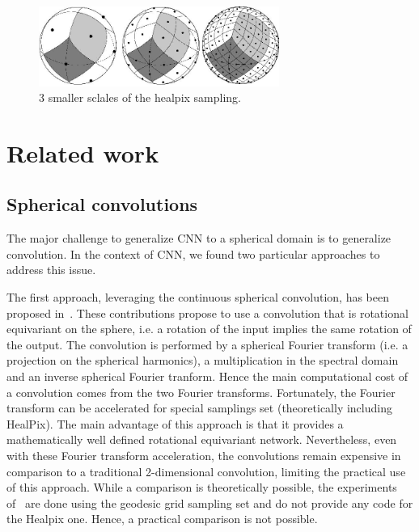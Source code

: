 \documentclass[final,twocolumn,3p,times,authoryear]{elsarticle}
\newcommand{\1}{\b{1}}              %
\newcommand{\0}{\b{0}}              %
\begin{document}
\begin{figure}[!ht]
\centering
\includegraphics[width=0.7\textwidth]{figures/healpix-3layers.jpg}
\caption{3 smaller sclales of the healpix sampling.}
\label{fig:healpix_sampling}
\end{figure}

\section{Related work}
\label{sec:related}



\subsection{Spherical convolutions} 
The major challenge to generalize CNN to a
spherical domain is to generalize convolution. In the context of CNN, we found
two particular approaches to address this issue.

The first approach, leveraging the continuous spherical convolution, has been
proposed in~\cite{cohen2017convolutional,cohen2018spherical}. These
contributions propose to use a convolution that is rotational equivariant on the
sphere, i.e. a rotation of the input implies the same rotation of the output.
The convolution is performed by a spherical Fourier transform (i.e. a projection
on the spherical harmonics), a  multiplication in the spectral domain and an
inverse spherical Fourier tranform. Hence the main computational cost of a
convolution comes from the two Fourier transforms. Fortunately, the Fourier
transform can be accelerated for special samplings set (theoretically including
HealPix). The main advantage of this approach is that it provides a
mathematically well defined rotational equivariant network. Nevertheless, even
with these Fourier transform acceleration, the convolutions remain expensive in
comparison to a traditional 2-dimensional convolution, limiting the practical use of this
approach. While a comparison is theoretically possible, the experiments
of~\cite{cohen2018spherical} are done using the geodesic grid sampling set and
do not provide any code for the Healpix one. Hence, a practical comparison is
not possible.
\end{document}

